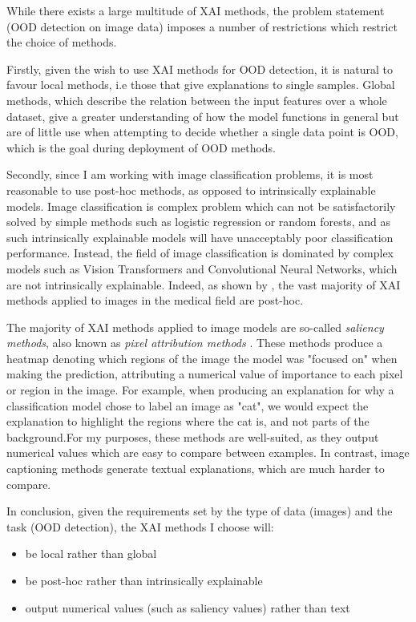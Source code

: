 \documentclass[UKenglish]{uiomasterthesis} %
\theoremstyle{definition}
\begin{document}
While there exists a large multitude of XAI methods, the problem statement (OOD detection on image data) imposes a number of restrictions which restrict the choice of methods.

Firstly, given the wish to use XAI methods for OOD detection, it is natural to favour local methods, i.e those that give explanations to single samples. Global methods, which describe the relation between the input features over a whole dataset, give a greater understanding of how the model functions in general but are of little use when attempting to decide whether a single data point is OOD, which is the goal during deployment of OOD methods.

Secondly, since I am working with image classification problems, it is most reasonable to use post-hoc methods, as opposed to intrinsically explainable models.  Image classification is complex problem which can not be satisfactorily solved by simple methods such as logistic regression or random forests, and as such intrinsically explainable models will have unacceptably poor classification performance. Instead, the field of image classification is dominated by complex models such as Vision Transformers and Convolutional Neural Networks, which are not intrinsically explainable. Indeed, as shown by \cite{xaioverview}, the vast majority of XAI methods applied to images in the medical field are post-hoc.

The majority of XAI methods applied to image models are so-called {\it saliency methods}, also known as {\it pixel attribution methods} \cite{molnar}. These methods produce a heatmap denoting which regions of the image the model was "focused on" when making the prediction, attributing a numerical value of importance to each pixel or region in the image. For example, when producing an explanation for why a classification model chose to label an image as "cat", we would expect the explanation to highlight the regions where the cat is, and not parts of the background.For my purposes, these methods are well-suited, as they output numerical values which are easy to compare between examples. In contrast, image captioning methods generate textual explanations, which are much harder to compare.

In conclusion, given the requirements set by the type of data (images) and the task (OOD detection), the XAI methods I choose will:

\begin{itemize}
    \item be local rather than global
    \item be post-hoc rather than intrinsically explainable
    \item output numerical values (such as saliency values) rather than text
\end{itemize}
\end{document}
